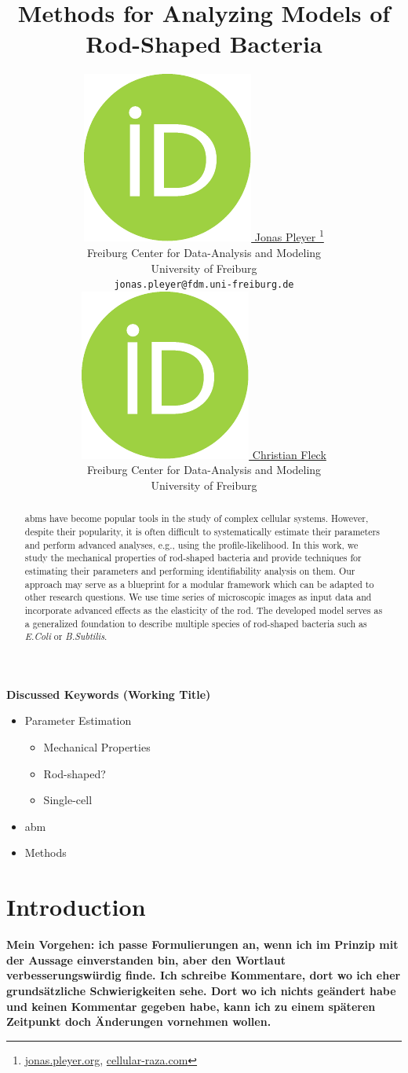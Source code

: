 \documentclass{article}
\title{Methods for Analyzing Models of\\ Rod-Shaped Bacteria}
\author{
    \href{https://orcid.org/0009-0001-0613-7978}{
        \includegraphics[scale=0.06]{figures/orcid.pdf}
        \hspace{1mm}Jonas Pleyer
    }
    \thanks{
        \href{https://jonas.pleyer.org}{jonas.pleyer.org},
        \href{https://cellular-raza.com}{cellular-raza.com}
    }\\
	Freiburg Center for Data-Analysis and Modeling\\
	University of Freiburg\\
	\texttt{jonas.pleyer@fdm.uni-freiburg.de} \\
	\And
	\href{https://orcid.org/0000-0002-6371-4495}{
        \includegraphics[scale=0.06]{figures/orcid.pdf}
        \hspace{1mm}Christian Fleck
    }\\
	Freiburg Center for Data-Analysis and Modeling\\
	University of Freiburg
}
\begin{document}
\maketitle


\begin{abstract}
    \aclp{abm} have become popular tools in the study of complex cellular systems.
    However, despite their popularity, it is often difficult to systematically estimate their
    parameters and perform advanced analyses, e.g., using the profile-likelihood.
    In this work, we study the mechanical properties of rod-shaped bacteria and provide techniques
    for estimating their parameters and performing identifiability analysis on them.
    Our approach may serve as a blueprint for a modular framework which can be adapted to other
    research questions.
    We use time series of microscopic images as input data and incorporate advanced effects as the
    elasticity of the rod.
    The developed model serves as a generalized foundation to describe multiple species of
    rod-shaped bacteria such as \textit{E.Coli} or \textit{B.Subtilis}.
\end{abstract}

\textbf{Discussed Keywords (Working Title)}
\begin{itemize}
    \item Parameter Estimation
    \begin{itemize}
        \item Mechanical Properties
        \item Rod-shaped?
        \item Single-cell
    \end{itemize}
    \item \ac{abm}
    \item Methods
\end{itemize}

\pagebreak
\renewcommand{\contentsname}{Table of Contents (remove before submission)}
\tableofcontents
\vfill
\pagebreak

\section{Introduction}
\textbf{
    Mein Vorgehen: ich passe Formulierungen an, wenn ich im Prinzip mit der Aussage einverstanden
    bin, aber den Wortlaut verbesserungswürdig finde.
    Ich schreibe Kommentare, dort wo ich eher grundsätzliche Schwierigkeiten sehe.
    Dort wo ich nichts geändert habe und keinen Kommentar gegeben habe, kann ich zu einem späteren
    Zeitpunkt doch Änderungen vornehmen wollen.
}
\end{document}

